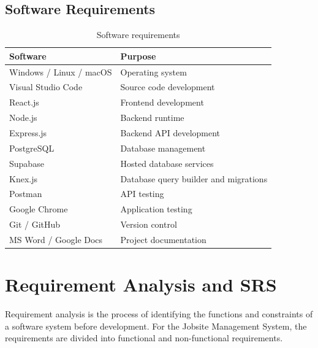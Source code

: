 \documentclass[11pt,a4paper]{article}
\newcommand{\hrow}{\rowcolor{gray!14}}
\newcommand{\tablestyle}{\centering\small\renewcommand{\arraystretch}{1.3}}
\begin{document}
\subsection{Software Requirements}
\begin{table}[H]
\tablestyle
\begin{tabularx}{\linewidth}{>{\raggedright\arraybackslash}p{4.5cm}Y}
\toprule
\hrow\textbf{Software} & \textbf{Purpose}\\
\midrule
Windows / Linux / macOS & Operating system\\
Visual Studio Code & Source code development\\
React.js & Frontend development\\
Node.js & Backend runtime\\
Express.js & Backend API development\\
PostgreSQL & Database management\\
Supabase & Hosted database services\\
Knex.js & Database query builder and migrations\\
Postman & API testing\\
Google Chrome & Application testing\\
Git / GitHub & Version control\\
MS Word / Google Docs & Project documentation\\
\bottomrule
\end{tabularx}
\caption{Software requirements}
\end{table}

\section{Requirement Analysis and SRS}
Requirement analysis is the process of identifying the functions and constraints of a software system before development. For the Jobsite Management System, the requirements are divided into functional and non-functional requirements.
\end{document}

